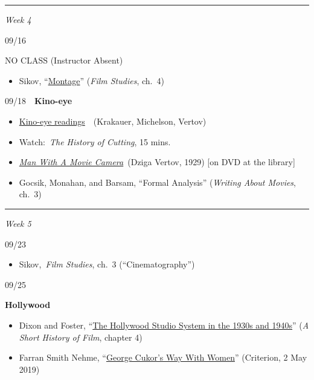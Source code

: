 \documentclass[
  letterpaper,
  DIV=11,
  numbers=noendperiod,
  oneside]{scrartcl}
\providecommand{\tightlist}{%
  \setlength{\itemsep}{0pt}\setlength{\parskip}{0pt}}
\begin{document}
\begin{center}\rule{0.5\linewidth}{0.5pt}\end{center}

\emph{Week 4}

09/16

NO CLASS (Instructor Absent)

\begin{itemize}
\tightlist
\item
  Sikov, ``\href{pdf/sikov-montage.pdf}{Montage}'' (\emph{Film Studies},
  ch.~4)
\end{itemize}

09/18~~\textbf{Kino-eye}

\begin{itemize}
\item
  \href{pdf/kino-eye.pdf}{Kino-eye readings}~~(Krakauer, Michelson,
  Vertov)
\item
  Watch:~\emph{The History of Cutting}, 15 mins.
\item
  \href{https://franklinpierce.on.worldcat.org/oclc/52408086}{\emph{Man
  With A Movie Camera}}~(Dziga Vertov, 1929) {[}on DVD at the library{]}
\item
  Gocsik, Monahan, and Barsam, ``Formal Analysis'' (\emph{Writing About
  Movies}, ch.~3)
\end{itemize}

\begin{center}\rule{0.5\linewidth}{0.5pt}\end{center}

\emph{Week 5}

09/23

\begin{itemize}
\tightlist
\item
  Sikov,~\emph{Film Studies}, ch.~3 (``Cinematography'')
\end{itemize}

09/25~

\textbf{Hollywood}

\begin{itemize}
\tightlist
\item
  Dixon and Foster, ``\href{pdf/dixon-foster-ch4.pdf}{The Hollywood
  Studio System in the 1930s and 1940s}'' (\emph{A Short History of
  Film}, chapter 4)
\item
  Farran Smith Nehme,
  ``\href{https://www.criterion.com/current/posts/6331-george-cukor-s-way-with-women}{George
  Cukor's Way With Women}'' (Criterion, 2 May 2019)
\end{itemize}
\end{document}
